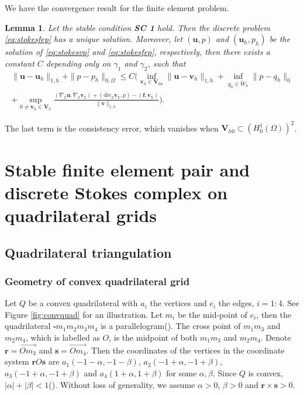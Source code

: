\documentclass[12pt,showkeys]{amsart}
\newtheorem{lemma}[theorem]{Lemma}
\begin{document}
We have the convergence result for the finite element problem.
\begin{lemma}\label{lem:clm}\cite{Arnold.D1994,Brezzi.F;Fortin.M1991}
Let the stable condition \textbf{SC 1} hold. Then the discrete problem \eqref{eq:stokesfep} has a unique solution. Moreover, let $(\mathbf{u},p)$ and $(\mathbf{u}_h,p_h)$ be the solution of \eqref{eq:stokesvp} and \eqref{eq:stokesfep}, respectively, then there exists a constant $C$ depending only on $\gamma_1$ and $\gamma_2$, such that
\begin{multline*}
\|\mathbf{u}-\mathbf{u}_h\|_{1,h}+\|p-p_h\|_{0,\Omega}\leqslant C\Bigg(\inf_{\mathbf{v}_h\in\mathbf{V}_{h0}}\|\mathbf{u}-\mathbf{v}_h\|_{1,h}+\inf_{q_h\in \mathring{W}_h}\|p-q_h\|_0 \\ 
+\sup_{0\neq\mathbf{v}_h\in\mathbf{V}_h}\frac{(\nabla_h\mathbf{u},\nabla_h\mathbf{v}_h)+(\mathrm{div}_h\mathbf{v}_h,p)-(\mathbf{f},\mathbf{v}_h)}{\|\mathbf{v}\|_{1,h}}\Bigg).
\end{multline*}
\end{lemma}
The last term is the consistency error, which vanishes when $\mathbf{V}_{h0}\subset (H^1_0(\Omega))^2$.

\section{Stable finite element pair and discrete Stokes complex on quadrilateral grids}
\label{sec:stap}

\subsection{Quadrilateral triangulation}

\subsubsection{Geometry of convex quadrilateral grid}

Let $Q$ be a convex quadrilateral with $a_i$ the vertices and $e_i$ the edges, $i=1:4$. See Figure \ref{fig:convquad} for an illustration. Let $m_i$ be the mid-point of $e_i$, then the quadrilateral $\square m_1m_2m_3m_4$ is a parallelogram(\cite{Park.C;Sheen.D2003}). The cross point of $m_1m_3$ and $m_2m_4$, which is labelled as $O$, is the midpoint of both $m_1m_3$ and $m_2m_4$. Denote $\mathbf{r}=\overrightarrow{Om_3}$ and $\mathbf{s}=\overrightarrow{Om_4}$. Then the coordinates of the vertices in the coordinate system ${\mathbf{r}} O{\mathbf{s}}$ are $a_1(-1-\alpha,-1-\beta)$, $a_2(-1+\alpha,-1+\beta)$, $a_3(-1+\alpha,-1+\beta)$ and $a_4(1+\alpha,1+\beta)$ for some $\alpha,\beta$. 
Since $Q$ is convex, $|\alpha|+|\beta|<1$(\cite{Park.C;Sheen.D2013}). Without loss of generality, we assume $\alpha>0$, $\beta>0$ and ${\mathbf{r}}\times{\mathbf{s}}>0$.
\end{document}
